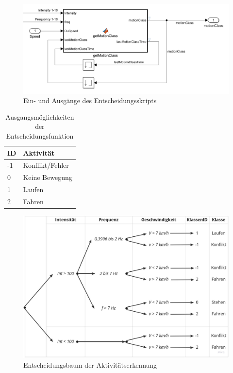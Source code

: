 \begin{figure}
	\centering
	\includegraphics[width=\linewidth]{Bilder/getMotionClass_mFile.png}
	\caption{Ein- und Ausgänge des Entscheidungsskripts}
	\label{fig:getMotionClass_mFile}
\end{figure}

\begin{table}
	\caption{Ausgangsmöglichkeiten der Entscheidungsfunktion} 
	\centering
	\begin{tabular}{|l|l|}%
			\hline
			\textbf{ID} & \textbf{Aktivität} \\
			\hline
			-1 & Konflikt/Fehler \\
			\hline
			0 & Keine Bewegung \\
			\hline
			1 & Laufen \\
			\hline
			2 & Fahren \\
			\hline
		\end{tabular}
	\label{tab:MotionClass}
\end{table}

\begin{figure}
	\centering
	\includegraphics[width=\linewidth]{Bilder/Entscheidungsbaum_mFile.pdf}
	\caption{Entscheidungsbaum der Aktivitätserkennung}
	\label{fig:Lauferkennung_FFT_Entscheidungsbaum_mFile}
\end{figure}

